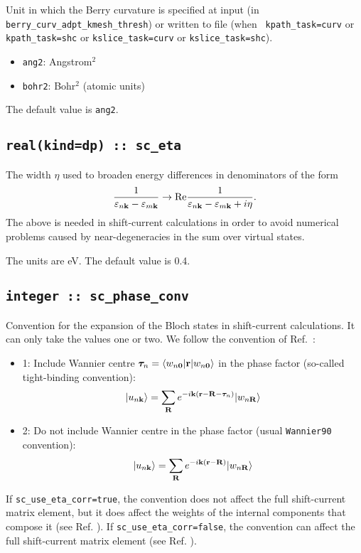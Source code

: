 Unit in which the Berry curvature is specified at input (in {\tt
  berry\_curv\_adpt\_kmesh\_thresh}) or written to file (when {\tt
  kpath\_task=curv} or {\tt
  kpath\_task=shc} or {\tt kslice\_task=curv} or {\tt kslice\_task=shc}).

\begin{itemize}

\item
  {\tt ang2}: Angstrom$^2$

\item
  {\tt bohr2}: Bohr$^2$ (atomic units)

\end{itemize}

The default value is {\tt ang2}.


\subsection{\tt real(kind=dp) :: sc\_eta}

The width $\eta$ used to broaden energy differences in denominators of the form 
%
$$
\frac{1}{\varepsilon_{n\bf{k}}-\varepsilon_{m\bf{k}}}\rightarrow
\text{Re}\frac{1}{\varepsilon_{n\bf{k}}-\varepsilon_{m\bf{k}}+i\eta}.
$$ 
%
The above is needed in shift-current calculations in order to avoid numerical problems
caused by near-degeneracies in the sum over virtual states. 

The units are eV. The default value is 0.4.


\subsection{\tt integer :: sc\_phase\_conv}

Convention for the expansion of the Bloch states in shift-current calculations. It can only take the values one or two.
We follow the convention of Ref.~\cite{pythtb}:
\begin{itemize}

\item
  1: Include Wannier centre ${\bm \tau}_{n}=\langle w_{n{\bf 0}}|{\bf r}| w_{n{\bf 0}} \rangle$ in the phase factor
  (so-called tight-binding convention):
%
$$
|u_{n\bf{k}}\rangle = \sum_{\bf{R}} e^{-i{\bf k}({\bf r}-{\bf R}-{\bm \tau}_{n})}| w_{n\bf{R}} \rangle
$$ 
%

\item
  2: Do not include Wannier centre in the phase factor (usual \verb|Wannier90| convention):
%
$$
|u_{n\bf{k}}\rangle = \sum_{\bf{R}} e^{-i\bf{k}(\bf{r}-\bf{R})}| w_{n\bf{R}} \rangle
$$ 
%
\end{itemize}
If {\tt sc\_use\_eta\_corr=true}, the convention does not affect the full shift-current matrix element, but it does affect
the weights of the internal components that compose it (see Ref. \cite{ibanez-azpiroz_ab_2018}).
If {\tt sc\_use\_eta\_corr=false}, the convention can affect the full shift-current matrix element (see Ref. \cite{Lihm_shift_eta_2021}).

